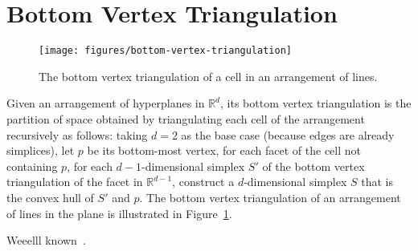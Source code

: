 \section{Bottom Vertex Triangulation}%
\label{sec:arrangements:triangulation}

\begin{figure}
  \centering{}
  \texttt{[image: figures/bottom-vertex-triangulation]}
  \caption{%
    The bottom vertex triangulation of a cell in an arrangement of lines.%
  }%
  \label{fig:bvt}
\end{figure}

Given an arrangement of hyperplanes in \(\mathbb{R}^d\), its bottom vertex
triangulation is the partition of space obtained by triangulating each cell of
the arrangement recursively as follows: taking \(d=2\) as the base case
(because edges are already simplices),
let \(p\) be its bottom-most vertex,
for each facet of the cell not containing \(p\),
for each \(d-1\)-dimensional simplex \(S'\) of the bottom vertex triangulation
of the facet in \(\mathbb{R}^{d-1}\),
construct a \(d\)-dimensional simplex \(S\) that is the convex hull of
\(S'\) and \(p\).
%
The
bottom vertex triangulation of an arrangement of lines in the plane is illustrated
in Figure~\ref{fig:bvt}.

Weeelll known~\cite{GO04,Cla88}.

